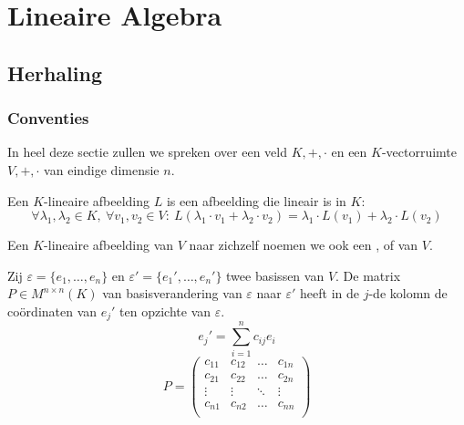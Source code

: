 \documentclass[main.tex]{subfiles}
\begin{document}
\chapter{Lineaire Algebra}
\label{cha:lineaire-algebra}

\section{Herhaling}
\label{sec:herhaling}

\subsection{Conventies}
\label{sec:conventies}


In heel deze sectie zullen we spreken over een veld $K,+,\cdot$ en een $K$-vectorruimte $V,+,\cdot$ van eindige dimensie $n$.

\begin{de}
  Een $K$-lineaire afbeelding $L$ is een afbeelding die lineair is in $K$:
  \[ \forall \lambda_{1},\lambda_{2}\in K,\ \forall v_{1},v_{2}\in V:\ L(\lambda_{1}\cdot v_{1}+\lambda_{2}\cdot v_{2}) = \lambda_{1} \cdot  L(v_{1}) + \lambda_{2} \cdot L(v_{2}) \]
\end{de}
\begin{de}
  Een $K$-lineaire afbeelding van $V$ naar zichzelf noemen we ook een ,  of  van $V$.
\end{de}

\begin{st}
  Zij $\varepsilon = \{e_{1},\dotsc,e_{n}\}$ en $\varepsilon'= \{ e_{1}',\dotsc,e_{n}'\}$ twee basissen van $V$.
  De matrix $P \in M^{n\times n}(K)$ van basisverandering van $\varepsilon$ naar $\varepsilon'$ heeft in de $j$-de kolomn de co\"ordinaten van $e_{j}'$ ten opzichte van $\varepsilon$.
  \[ e_{j}' = \sum_{i=1}^{n}c_{ij}e_{i} \]
  \[
  P = 
  \begin{pmatrix}
    c_{11} & c_{12} & \hdots & c_{1n}\\
    c_{21} & c_{22} & \hdots & c_{2n}\\
    \vdots & \vdots & \ddots & \vdots\\
    c_{n1} & c_{n2} & \hdots & c_{nn}\\
  \end{pmatrix}
  \]
\end{st}
\end{document}
